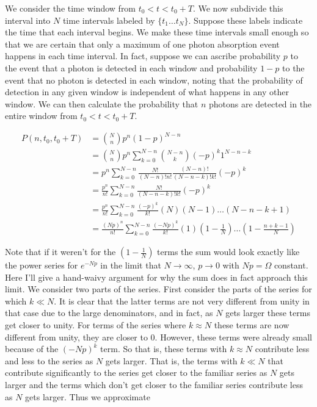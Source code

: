 \documentclass[12pt]{article}
\begin{document}
We consider the time window from $t_0<t<t_0+T$. We now subdivide this interval into $N$ time intervals labeled by $\{t_1 \ldots t_N\}$. Suppose these labels indicate the time that each interval begins. We make these time intervals small enough so that we are certain that only a maximum of one photon absorption event happens in each time interval. In fact, suppose we can ascribe probability $p$ to the event that a photon is detected in each window and probability $1-p$ to the event that no photon is detected in each window, noting that the probability of detection in any given window is independent of what happens in any other window. We can then calculate the probability that $n$ photons are detected in the entire window from $t_0<t<t_0+T$.

\begin{align}
P(n,t_0,t_0+T) &= \binom{N}{n} p^n(1-p)^{N-n}\\
&=\binom{N}{n} p^n \sum_{k=0}^{N-n} \binom{N-n}{k} (-p)^{k} 1^{N-n-k}\\
&= p^n\sum_{k=0}^{N-n} \frac{N!}{(N-n)!n!} \frac{(N-n)!}{(N-n-k)!k!}(-p)^{k}\\
&= \frac{p^n}{n!}\sum_{k=0}^{N-n} \frac{N!}{(N-n-k)!k!} (-p)^{k}\\
&= \frac{p^n}{n!} \sum_{k=0}^{N-n} \frac{(-p)^k}{k!} (N)(N-1)\ldots(N-n-k+1)\\
&= \frac{(Np)^n}{n!} \sum_{k=0}^{N-n} \frac{(-Np)^k}{k!}\left(1\right) \left(1-\frac{1}{N}\right) \ldots \left(1 - \frac{n+k-1}{N} \right)
\end{align}

Note that if it weren't for the $\left(1-\frac{1}{N}\right)$ terms the sum would look exactly like the power series for $e^{-Np}$ in the limit that $N\rightarrow \infty$, $p \rightarrow 0$ with $Np = \Omega$ constant. Here I'll give a hand-waivy argument for why the sum does in fact approach this limit. We consider two parts of the series. First consider the parts of the series for which $k\ll N$. It is clear that the latter terms are not very different from unity in that case due to the large denominators, and in fact, as $N$ gets larger these terms get closer to unity. For terms of the series where $k \approx N$ these terms are now different from unity, they are closer to 0. However, these terms were already small because of the $(-Np)^k$ term. So that is, these terms with $k \approx N$ contribute less and less to the series as $N$ gets larger. That is, the terms with $k \ll N$ that contribute significantly to the series get closer to the familiar series as $N$ gets larger and the terms which don't get closer to the familiar series contribute less as $N$ gets larger. Thus we approximate
\end{document}
